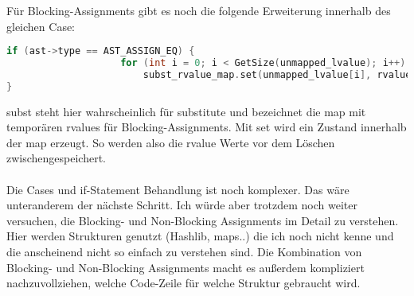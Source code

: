 \documentclass[11pt]{report}
\begin{document}
Für Blocking-Assignments gibt es noch die folgende Erweiterung innerhalb des gleichen Case:
\begin{lstlisting}[language=C++]
if (ast->type == AST_ASSIGN_EQ) {
					for (int i = 0; i < GetSize(unmapped_lvalue); i++)
						subst_rvalue_map.set(unmapped_lvalue[i], rvalue[i]);
}	
\end{lstlisting}
subst steht hier wahrscheinlich für substitute und bezeichnet die map mit temporären rvalues für Blocking-Assignments.
Mit set wird ein Zustand innerhalb der map erzeugt. So werden also die rvalue Werte vor dem Löschen zwischengespeichert.
\\
\\
Die Cases und if-Statement Behandlung ist noch komplexer. Das wäre unteranderem der nächste Schritt. Ich würde aber trotzdem noch weiter versuchen, die Blocking- und Non-Blocking Assignments im Detail zu verstehen.  Hier werden Strukturen genutzt (Hashlib, maps..) die ich noch nicht kenne und die anscheinend nicht so einfach zu verstehen sind. Die Kombination von Blocking- und Non-Blocking Assignments macht es außerdem kompliziert nachzuvollziehen, welche Code-Zeile für welche Struktur gebraucht wird.
\end{document}
